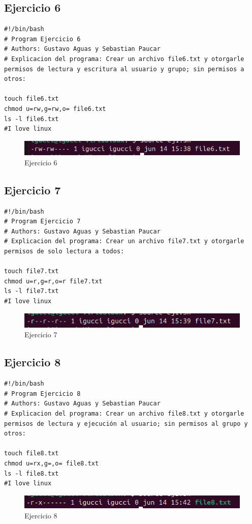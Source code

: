 \documentclass[11pt,twoside]{book}
\begin{document}
\subsection{Ejercicio 6}

\begin{lstlisting}
#!/bin/bash
# Program Ejercicio 6
# Authors: Gustavo Aguas y Sebastian Paucar
# Explicacion del programa: Crear un archivo file6.txt y otorgarle permisos de lectura y escritura al usuario y grupo; sin permisos a otros:

touch file6.txt
chmod u=rw,g=rw,o= file6.txt
ls -l file6.txt
#I love linux
\end{lstlisting}
\begin{figure}[h]
    \centering
    \includegraphics[width=1\linewidth]{psimb/ej6.png}
    \caption{Ejercicio 6}
\end{figure}

\subsection{Ejercicio 7}
\begin{lstlisting}
#!/bin/bash
# Program Ejercicio 7
# Authors: Gustavo Aguas y Sebastian Paucar
# Explicacion del programa: Crear un archivo file7.txt y otorgarle permisos de solo lectura a todos:

touch file7.txt
chmod u=r,g=r,o=r file7.txt
ls -l file7.txt
#I love linux
\end{lstlisting}
\begin{figure}[h]
    \centering
    \includegraphics[width=1\linewidth]{psimb/ej7.png}
    \caption{Ejercicio 7}
\end{figure}
\newpage
\subsection{Ejercicio 8}
\begin{lstlisting}
#!/bin/bash
# Program Ejercicio 8
# Authors: Gustavo Aguas y Sebastian Paucar
# Explicacion del programa: Crear un archivo file8.txt y otorgarle permisos de lectura y ejecución al usuario; sin permisos al grupo y otros:

touch file8.txt
chmod u=rx,g=,o= file8.txt
ls -l file8.txt
#I love linux
\end{lstlisting}
\begin{figure}[h]
    \centering
    \includegraphics[width=1\linewidth]{psimb/ej8.png}
    \caption{Ejercicio 8}
\end{figure}
\end{document}
